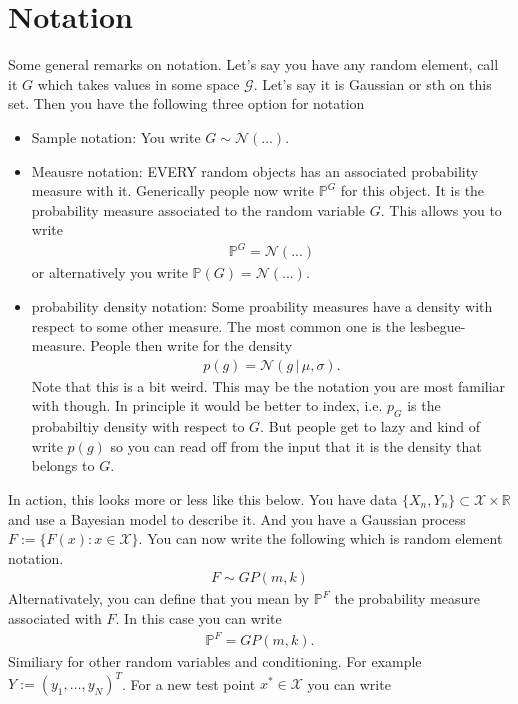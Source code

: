 \documentclass{article}
\newcommand{\bbP}{\mathbb{P}}
\newcommand{\bbR}{\mathbb{R}}
\numberwithin{equation}{section}
\begin{document}
\section{Notation}
Some general remarks on notation. Let's say you have any random element, call it $G$ which takes values in some space $\mathcal{G}$. Let's say it is Gaussian or sth on this set. Then you have the following three option for notation
\begin{itemize}
    \item Sample notation: You write $G \sim \mathcal{N}(...)$.
    \item Meausre notation: EVERY random objects has an associated probability measure with it. Generically people now write $\mathbb{P}^G$ for this object. It is the probability measure associated to the random variable $G$. This allows you to write
    \begin{align}
        \mathbb{P}^G = \mathcal{N}(...)
    \end{align}
    or alternatively you write $\mathbb{P}(G) = \mathcal{N}(...)$.
    \item probability density notation: Some proability measures have a density with respect to some other measure. The most common one is the lesbegue-measure. People then write for the density
    \begin{align}
        p(g) = \mathcal{N}(g \, | \, \mu, \sigma).
    \end{align}
    Note that this is a bit weird. This may be the notation you are most familiar with though. In principle it would be better to index, i.e. $p_G$ is the probabiltiy density with respect to $G$. But people get to lazy and kind of write $p(g)$ so you can read off from the input that it is the density that belongs to $G$.
\end{itemize}
In action, this looks more or less like this below.
You have data $\{X_n, Y_n\} \subset \mathcal{X} \times \bbR$ and use a Bayesian model to describe it. And you have a Gaussian process $ F:= \{ F(x) : x \in \mathcal{X}\}$. You can now write the following which is random element notation.
\begin{align}
    F \sim GP(m, k)
\end{align}
Alternativately, you can define that you mean by $\bbP^F$ the probability measure associated with $F$. In this case you can write
\begin{align}
    \mathbb{P}^F = GP(m,k).
\end{align}
Similiary for other random variables and conditioning. For example $Y:=(y_1, \hdots, y_N)^T$. For a new test point $x^* \in \mathcal{X}$ you can write
\end{document}
